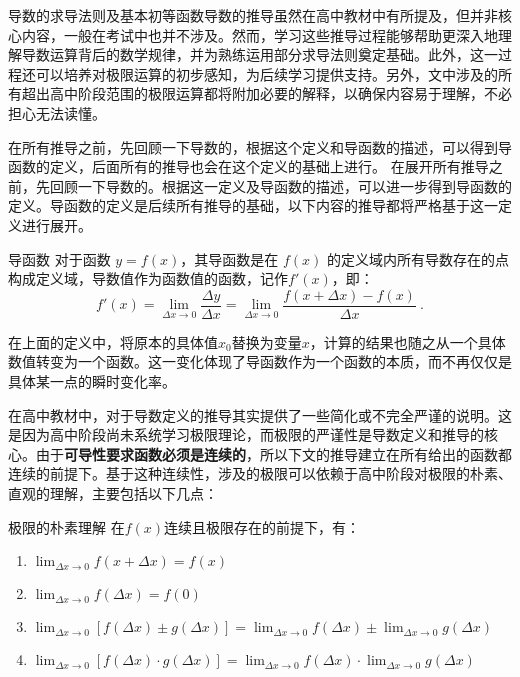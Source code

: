 导数的求导法则及基本初等函数导数的推导虽然在高中教材中有所提及，但并非核心内容，一般在考试中也并不涉及。然而，学习这些推导过程能够帮助更深入地理解导数运算背后的数学规律，并为熟练运用部分求导法则奠定基础。此外，这一过程还可以培养对极限运算的初步感知，为后续学习提供支持。另外，文中涉及的所有超出高中阶段范围的极限运算都将附加必要的解释，以确保内容易于理解，不必担心无法读懂。

在所有推导之前，先回顾一下导数的，根据这个定义和导函数的描述，可以得到导函数的定义，后面所有的推导也会在这个定义的基础上进行。
在展开所有推导之前，先回顾一下导数的。根据这一定义及导函数的描述，可以进一步得到导函数的定义。导函数的定义是后续所有推导的基础，以下内容的推导都将严格基于这一定义进行展开。

\begin{definition}{导函数}\label{def_HsDerB_1}
对于函数 $y=f(x)$，其导函数是在 $f(x)$ 的定义域内所有导数存在的点构成定义域，导数值作为函数值的函数，记作$f'(x)$，即：
\begin{equation}
f'(x)=\lim_{\Delta x\to 0}\frac{\Delta y}{\Delta x}=\lim_{\Delta x\to0}\frac{f(x+\Delta x)-f(x)}{\Delta x}~.
\end{equation}
\end{definition}

在上面的定义中，将原本的具体值$x_0$替换为变量$x$，计算的结果也随之从一个具体数值转变为一个函数。这一变化体现了导函数作为一个函数的本质，而不再仅仅是具体某一点的瞬时变化率。

在高中教材中，对于导数定义的推导其实提供了一些简化或不完全严谨的说明。这是因为高中阶段尚未系统学习极限理论，而极限的严谨性是导数定义和推导的核心。由于\textbf{可导性要求函数必须是连续的}，所以下文的推导建立在所有给出的函数都连续的前提下。基于这种连续性，涉及的极限可以依赖于高中阶段对极限的朴素、直观的理解，主要包括以下几点：

\begin{lemma}{极限的朴素理解}\label{lem_HsDerB_1}
在$f(x)$连续且极限存在的前提下，有：
\begin{enumerate}
\item $\displaystyle\lim_{\Delta x\to 0}f(x+\Delta x)=f(x)$
\item $\displaystyle\lim_{\Delta x\to 0}f(\Delta x)=f(0)$
\item $\displaystyle\lim_{\Delta x\to 0}[f(\Delta x)\pm g(\Delta x)]=\lim_{\Delta x\to 0}f(\Delta x)\pm \lim_{\Delta x\to 0}g(\Delta x)$
\item $\displaystyle\lim_{\Delta x\to 0}[f(\Delta x)\cdot g(\Delta x)]=\lim_{\Delta x\to 0}f(\Delta x)\cdot\lim_{\Delta x\to 0}g(\Delta x)$
\end{enumerate}
\end{lemma}


